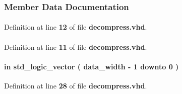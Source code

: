 \subsubsection{Member Data Documentation}
\paragraph[{ all }]{\hspace{0.3cm}{\ttfamily [Package]}}\label{classdecompress_a470a86ce8776f637b0483eabf2d92ad2}


Definition at line {\bf 12} of file {\bf decompress.\+vhd}.

\paragraph[{altera\+\_\+mf}]{\hspace{0.3cm}{\ttfamily [Library]}}\label{classdecompress_ad57cd8d31a38ff87ac163fb47757ffbf}


Definition at line {\bf 11} of file {\bf decompress.\+vhd}.

\paragraph[{data\+\_\+in}]{ {\bfseries \textcolor{keywordflow}{in}\textcolor{vhdlchar}{ }} {\bfseries \textcolor{comment}{std\+\_\+logic\+\_\+vector}\textcolor{vhdlchar}{ }\textcolor{vhdlchar}{(}\textcolor{vhdlchar}{ }\textcolor{vhdlchar}{ }\textcolor{vhdlchar}{ }\textcolor{vhdlchar}{ }{\bfseries {\bf data\+\_\+width}} \textcolor{vhdlchar}{-\/}\textcolor{vhdlchar}{ } \textcolor{vhdldigit}{1} \textcolor{vhdlchar}{ }\textcolor{keywordflow}{downto}\textcolor{vhdlchar}{ }\textcolor{vhdlchar}{ } \textcolor{vhdldigit}{0} \textcolor{vhdlchar}{ }\textcolor{vhdlchar}{)}\textcolor{vhdlchar}{ }} \hspace{0.3cm}{\ttfamily [Port]}}\label{classdecompress_ae8970283125be754ef38cafeb364ecd9}


Definition at line {\bf 28} of file {\bf decompress.\+vhd}.

